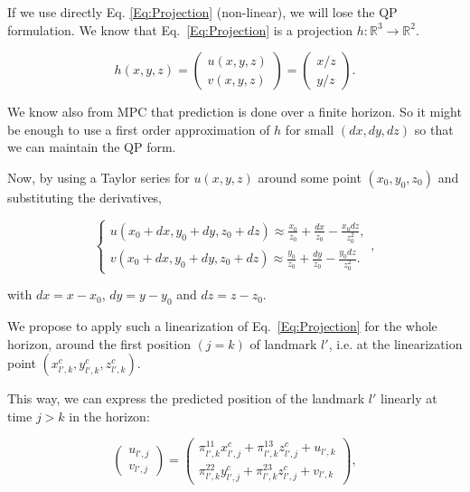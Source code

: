 If we use directly Eq. \ref{Eq:Projection} (non-linear), we will lose the QP formulation. 
We know that Eq.~\ref{Eq:Projection} is a projection $h:\mathbb{R}^3 \rightarrow \mathbb{R}^2$.

\begin{equation*}
h(x,y,z) =
 \left(
 \begin{matrix}
  u(x,y,z) \\
  v(x,y,z)
 \end{matrix}
 \right)
 = \left(
 \begin{matrix}
  x / z\\
  y / z
 \end{matrix}
 \right).
\end{equation*}


We know also from MPC that prediction is done over a finite horizon. So it might be enough to use a first order approximation of $h$ for small $(dx,dy,dz)$ so that we can maintain the QP form.

Now, by using a Taylor series for $u(x,y,z)$ around some point $(x_0,y_0,z_0)$ and substituting the derivatives,


$$
\left\{
\begin{array}{c}
\nonumber
 u(x_0+dx,y_0+dy,z_0+dz) \approx \frac{x_0}{z_0} +  \frac{dx}{z_0} - \frac{x_0 dz}{z_0^2},\\
 v(x_0+dx,y_0+dy,z_0+dz) \approx \frac{y_0}{z_0} +  \frac{dy}{z_0} - \frac{y_0 dz}{z_0^2}.
\end{array}
\right.,
$$

with $dx=x-x_0$, $dy=y-y_0$ and $dz=z-z_0$. 

We propose to apply such a linearization of Eq.~\ref{Eq:Projection} for the whole horizon, around the first position $(j=k)$ of landmark $l'$, i.e. at the linearization point $(x^{c}_{l',k},y^{c}_{l',k},z^{c}_{l',k})$. 

This way, we can express the predicted position of the landmark $l'$ linearly at time $j>k$ in the horizon:

\begin{equation*}
 \left(
 \begin{matrix}
  u_{l',j} \\
  v_{l',j}
 \end{matrix}
 \right)
 = \left(
 \begin{matrix}
  \pi^{11}_{l',k} x^{c}_{l',j} + \pi^{13}_{l',k} z^{c}_{l',j}+ u_{l',k}\\
  \pi^{22}_{l',k} y^{c}_{l',j} + \pi^{23}_{l',k} z^{c}_{l',j} + v_{l',k}
 \end{matrix}
 \right),
\end{equation*}

